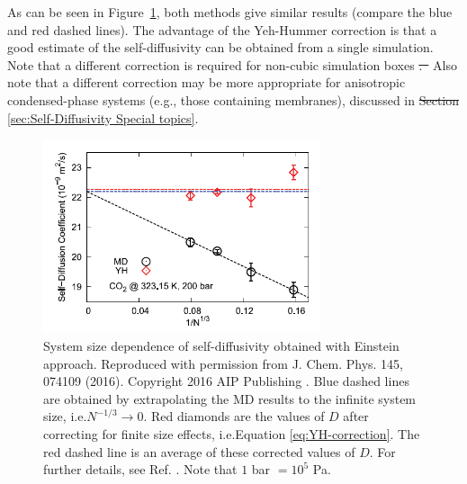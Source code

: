 \documentclass[9pt,bestpractices]{livecoms}
\providecommand{\DIFadd}[1]{{\protect\color{blue}\uwave{#1}}} %
\providecommand{\DIFdel}[1]{{\protect\color{red}\sout{#1}}}                      %
\providecommand{\DIFaddbegin}{} %
\providecommand{\DIFaddend}{} %
\providecommand{\DIFdelbegin}{} %
\providecommand{\DIFdelend}{} %
\providecommand{\DIFaddFL}[1]{\DIFadd{#1}} %
\providecommand{\DIFaddbeginFL}{} %
\providecommand{\DIFaddendFL}{} %
\begin{document}
\DIFaddend As can be seen in Figure~\ref{fig:MoultosFig1}, both methods give similar results (compare the blue and red dashed lines). The advantage of the Yeh-Hummer correction is that a good estimate of the self-diffusivity can be obtained from a single simulation. Note that a different correction is required for non-cubic simulation boxes \DIFdelbegin \DIFdel{.\mbox{%
\cite{Kikugawa:2015}}\hspace{0pt}%
}\DIFdelend \DIFaddbegin \DIFadd{\mbox{%
\cite{Kikugawa:2015}}\hspace{0pt}%
. }\DIFaddend Also note that a different correction may be more appropriate for anisotropic condensed-phase systems (e.g., those containing membranes), discussed in \DIFdelbegin \DIFdel{Section }\DIFdelend \DIFaddbegin \DIFadd{Sec.\ }\DIFaddend \ref{sec:Self-Diffusivity Special topics}.

\begin{figure}[htb!]
	\centering
	\includegraphics[width=3.2in]{MoultosFig1.png}
	\caption{System size dependence of self-diffusivity obtained with Einstein approach. Reproduced with permission from J. Chem. Phys. 145, 074109 (2016). Copyright 2016 AIP Publishing \cite{Moultos2016}. Blue dashed lines are obtained by extrapolating the MD results to the infinite system size, i.e.\DIFaddbeginFL \DIFaddFL{, }\DIFaddendFL $N^{-1/3} \to 0$. Red diamonds are the values of $D$ after correcting for finite size effects, i.e.\DIFaddbeginFL \DIFaddFL{, }\DIFaddendFL Equation \ref{eq:YH-correction}. The red dashed line is an average of these corrected values of $D$. For further details, see Ref. \cite{Moultos2016}. Note that $1$ bar $ = 10^5$ Pa.}
	\label{fig:MoultosFig1}
\end{figure}


\end{document}
